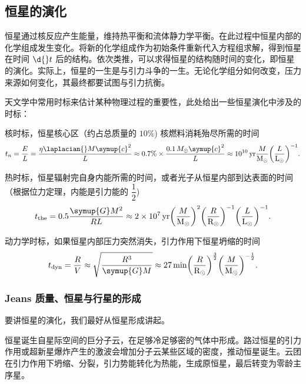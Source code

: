 \documentclass[../天体物理基础.tex]{subfiles}
\begin{document}
\subsection{恒星的演化}
恒星通过核反应产生能量，维持热平衡和流体静力学平衡。在此过程中恒星内部的化学组成发生变化。将新的化学组成作为初始条件重新代入方程组求解，得到恒星在时间 $\d{}t$ 后的结构。依次类推，可以求得恒星的结构随时间的变化，即恒星的演化。实际上，恒星的一生是与引力斗争的一生。无论化学组分如何改变，压力来源如何变化，其最终都要试图与引力抗衡。

天文学中常用时标来估计某种物理过程的重要性，此处给出一些恒星演化中涉及的时标：

核时标，恒星核心区（约占总质量的 $10\%$) 核燃料消耗殆尽所需的时间
\begin{equation}
t_{n}=\frac{E}{L}=\frac{\eta\laplacian{}M\symup{c}^{2}}{L}\approx0.7\%\times\frac{0.1\, M_{\odot}\symup{c}^{2}}{L}\approx\qty{e10}{yr}\frac{M}{\unit{M_{\odot}}}\mleft(\frac{L}{\unit{L_{\odot}}}\mright)^{-1}.
\end{equation}

热时标，恒星辐射完自身内能所需的时间，或者光子从恒星内部到达表面的时间（根据位力定理，内能是引力能的 $\dfrac{1}{2}$)
\begin{equation}
t_{\mathrm{the}}=0.5\frac{\symup{G}M^{2}}{RL}\approx\qty{2e7}{yr}\mleft(\frac{M}{\unit{M_{\odot}}}\mright)^{2}\mleft(\frac{R}{\unit{R_{\odot}}}\mright)^{-1}\mleft(\frac{L}{\unit{L_{\odot}}}\mright)^{-1}.
\end{equation}

动力学时标，如果恒星内部压力突然消失，引力作用下恒星坍缩的时间
\begin{equation}
t_{\mathrm{dyn}}=\frac{R}{V}\approx\sqrt\frac{R^{3}}{\symup{G}M}\approx\qty{27}{min}\mleft(\frac{R}{\unit{R_{\odot}}}\mright)^{\frac{3}{2}}\mleft(\frac{M}{\unit{M_{\odot}}}\mright)^{-\frac{1}{2}}.
\end{equation}

\subsubsection{Jeans 质量、恒星与行星的形成}
要讲恒星的演化，我们最好从恒星形成讲起。

恒星诞生自星际空间的巨分子云，在足够冷足够密的气体中形成。路过恒星的引力作用或超新星爆炸产生的激波会增加分子云某些区域的密度，推动恒星诞生。云团在引力作用下坍缩、分裂，引力势能转化为热能，生成原恒星，最后转变为零龄主序星。
\end{document}
